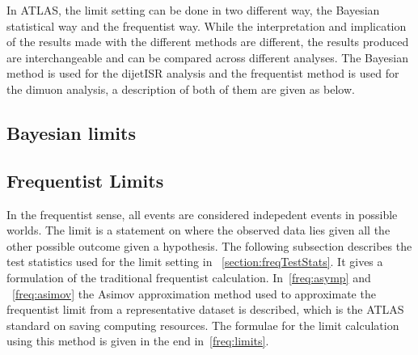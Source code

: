 In ATLAS, the limit setting can be done in two different way, the Bayesian statistical way and the frequentist way. While the interpretation and implication of the results made with the different methods are different, the results produced are interchangeable and can be compared across different analyses. 
The Bayesian method is used for the dijetISR analysis and the frequentist method is used for the dimuon analysis, a description of both of them are given as below.

%

\subsection{Bayesian limits}

\subsection{Frequentist Limits}
\label{sec:freq}
In the frequentist sense, all events are considered indepedent events in possible worlds. The limit is a statement on where the observed data lies given all the other possible outcome given a hypothesis. 
The following subsection describes the test statistics used for the limit setting in ~\ref{section:freqTestStats}. It gives a formulation of the traditional frequentist calculation. In~\ref{freq:asymp} and ~\ref{freq:asimov} the Asimov approximation method used to approximate the frequentist limit from a representative dataset is described, which is the ATLAS standard on saving computing resources. The formulae for the limit calculation using this method is given in the end in~\ref{freq:limits}.

